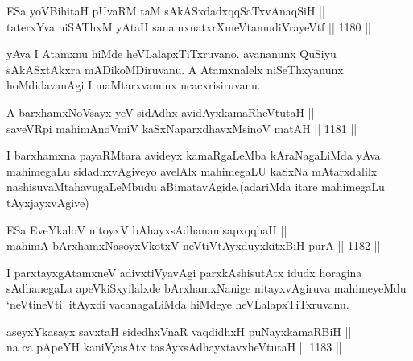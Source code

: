 

\begin{shl}
ESa yoV\s BihitaH pUvaRM taM sAkASxdadxqqSaTxvAnaqSiH || \\
taterxYva niSAThxM yAtaH sanamxnatxrXmeVtamudiVrayeVtf \hfill || 1180 ||  
\end{shl}

\begin{artha}
yAva I Atamxnu hiMde heVLalapxTiTxruvano. avananunx QuSiyu sAkASxtAkxra mADikoMDiruvanu. A Atamxnalelx niSeThxyanunx hoMdidavanAgi I maMtarxvanunx ucacxrisiruvanu.
\end{artha}


\begin{shl}
A barxhamxNoV\s sayx yeV sidAdhx avidAyxkamaRheVtutaH || \\
saveVR\s pi mahimAnoV\s miV kaSxNaparxdhavxMsinoV matAH \hfill || 1181 ||  
\end{shl}

\begin{artha}
I barxhamxna payaRMtara avideyx kamaRgaLeMba kAraNagaLiMda yAva mahimegaLu sidadhxvAgiveyo avelAlx mahimegaLU kaSxNa mAtarxdalilx nashisuvaMtahavugaLeMbudu aBimatavAgide.(adariMda itare mahimegaLu tAyxjayxvAgive)
\end{artha}

\begin{shl}
ESa EveYkaloV nitoyxV bAhayxsAdhananisapxqqhaH || \\
mahimA bArxhamxNasoyxVkotxV neVtiVtAyxduyxkitxBiH purA \hfill || 1182 ||  
\end{shl}

\begin{artha}
I parxtayxgAtamxneV adivxtiVyavAgi parxkAshisutAtx idudx horagina sAdhanegaLa apeVkiSxyilalxde bArxhamxNanige nitayxvAgiruva mahimeyeMdu `neVtineVti' itAyxdi vacanagaLiMda hiMdeye heVLalapxTiTxruvanu.
\end{artha}

\begin{shl}
aseyxYkasayx savxtaH sidedhxVnaR vaqdidhxH puNayxkamaRBiH || \\
na ca pApeYH kaniVyasAtx tasAyxsAdhayxtavxheVtutaH \hfill || 1183 ||  
\end{shl}

